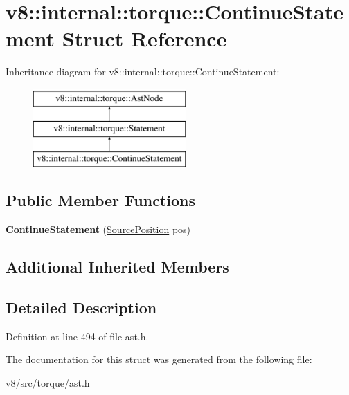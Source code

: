 \hypertarget{structv8_1_1internal_1_1torque_1_1ContinueStatement}{}\section{v8\+:\+:internal\+:\+:torque\+:\+:Continue\+Statement Struct Reference}
\label{structv8_1_1internal_1_1torque_1_1ContinueStatement}
Inheritance diagram for v8\+:\+:internal\+:\+:torque\+:\+:Continue\+Statement\+:\begin{figure}[H]
\begin{center}
\leavevmode
\includegraphics[height=3.000000cm]{structv8_1_1internal_1_1torque_1_1ContinueStatement}
\end{center}
\end{figure}
\subsection*{Public Member Functions}
\begin{DoxyCompactItemize}
\item 
\mbox{\label{structv8_1_1internal_1_1torque_1_1ContinueStatement_adc0d79a5fd26ac4f821d6b740b29de2c}} 
{\bfseries Continue\+Statement} (\mbox{\hyperlink{structv8_1_1internal_1_1torque_1_1SourcePosition}{Source\+Position}} pos)
\end{DoxyCompactItemize}
\subsection*{Additional Inherited Members}


\subsection{Detailed Description}


Definition at line 494 of file ast.\+h.



The documentation for this struct was generated from the following file\+:\begin{DoxyCompactItemize}
\item 
v8/src/torque/ast.\+h\end{DoxyCompactItemize}

